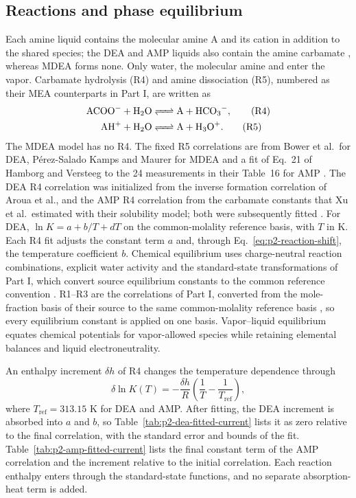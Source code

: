 \subsection{Reactions and phase equilibrium}\label{sec:p2-reactions}
Each amine liquid contains the molecular amine A and its cation  in addition to the shared species; the DEA and AMP liquids also contain the amine carbamate , whereas MDEA forms none.
Only water, the molecular amine and \COtwo enter the vapor.
Carbamate hydrolysis (R4) and amine dissociation (R5), numbered as their MEA counterparts in Part I, are written as
\begin{align}
 \ce{ACOO- + H2O &<=> A + HCO3-},\tag{R4}\label{eq:p2-r4}\\
 \ce{AH+ + H2O &<=> A + H3O+}.\tag{R5}\label{eq:p2-r5}
\end{align}
The MDEA model has no R4.
The fixed R5 correlations are from Bower et al.\ for DEA, P\'erez-Salado Kamps and Maurer for MDEA and a fit of Eq.~21 of Hamborg and Versteeg to the 24 measurements in their Table~16 for AMP \cite[Eq.~7, p.~73]{bowerAcidicDissociationConstant1962}\cite{perez-saladokampsDissociationConstantNMethyldiethanolamine1996}\cite[Table~16]{hamborgDissociationConstantsThermodynamic2009}.
The DEA R4 correlation was initialized from the inverse formation correlation of Aroua et al., and the AMP R4 correlation from the carbamate constants that Xu et al.\ estimated with their solubility model; both were subsequently fitted \cite[Eq.~14, p.~695]{arouaTemperatureDependencyEquilibrium1997}\cite[Table~2, Eqs.~7--11]{xuRepresentationEquilibriumSolubility1992}.
For DEA, $\ln K=a+b/T+dT$ on the common-molality reference basis, with $T$ in K.
Each R4 fit adjusts the constant term $a$ and, through Eq.~\eqref{eq:p2-reaction-shift}, the temperature coefficient $b$.
Chemical equilibrium uses charge-neutral reaction combinations, explicit water activity and the standard-state transformations of Part I, which convert source equilibrium constants to the common reference convention \cite[Sect.~2]{PolleyPartI}.
R1--R3 are the correlations of Part I, converted from the mole-fraction basis of their source to the same common-molality reference basis \cite[Table~1]{PolleyPartI}, so every equilibrium constant is applied on one basis.
Vapor--liquid equilibrium equates chemical potentials for vapor-allowed species while retaining elemental balances and liquid electroneutrality.

An enthalpy increment $\delta h$ of R4 changes the temperature dependence through
\begin{equation}
 \delta\ln K(T)=-\frac{\delta h}{R}\left(\frac1T-\frac1{T_{\mathrm{ref}}}\right),
 \label{eq:p2-reaction-shift}
\end{equation}
where $T_{\mathrm{ref}}=313.15$ K for DEA and AMP.
After fitting, the DEA increment is absorbed into $a$ and $b$, so Table~\ref{tab:p2-dea-fitted-current} lists it as zero relative to the final correlation, with the standard error and bounds of the fit.
Table~\ref{tab:p2-amp-fitted-current} lists the final constant term of the AMP correlation and the increment relative to the initial correlation.
Each reaction enthalpy enters through the standard-state functions, and no separate absorption-heat term is added.
